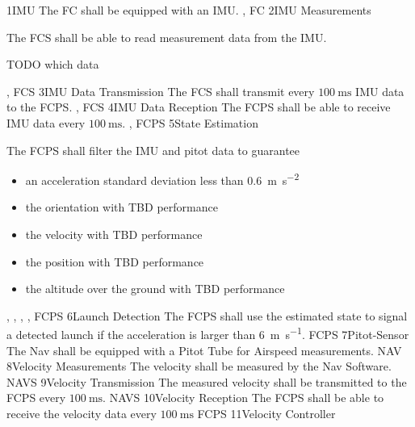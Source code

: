 \req
    {1}{IMU}
    {
        The FC shall be equipped with an IMU.
    }
    {, }
    {FC}
\req
    {2}{IMU Measurements}
    {
        The FCS shall be able to read measurement data from the IMU.

        TODO which data
    }
    {, }
    {FCS}
\req
    {3}{IMU Data Transmission}
    {
        The FCS shall transmit every $\SI{100}{\milli\second}$ IMU data to the FCPS.
    }
    {, }
    {FCS}
\req
    {4}{IMU Data Reception}
    {
        The FCPS shall be able to receive IMU data every $\SI{100}{\milli\second}$.
    }
    {, }
    {FCPS}
\req
    {5}{State Estimation}
    {
        The FCPS shall filter the IMU and pitot data to guarantee
        \begin{itemize}
            \item an acceleration standard deviation less than \SI{0.6}{\meter \per \second^2}
            \item the orientation with TBD performance
            \item the velocity with TBD performance
            \item the position with TBD performance
            \item the altitude over the ground with TBD performance
        \end{itemize}
    }
    {, , , , }
    {FCPS}
\req
    {6}{Launch Detection}
    {
        The FCPS shall use the estimated state to signal a detected
        launch if the acceleration is larger than \SI{6}{\meter \per \second}.
    }
    {}
    {FCPS}
\req
    {7}{Pitot-Sensor}
    {
        The Nav shall be equipped with a Pitot Tube for Airspeed measurements.
    }
    {}
    {NAV}
\req
    {8}{Velocity Measurements}
    {
        The velocity shall be measured by the Nav Software.
    }
    {}
    {NAVS}
\req
    {9}{Velocity Transmission}
    {
        The measured velocity shall be transmitted to the
        FCPS every $\SI{100}{\milli \second}$.
    }
    {}
    {NAVS}
\req
    {10}{Velocity Reception}
    {
        The FCPS shall be able to receive the velocity data
        every $\SI{100}{\milli\second}$
    }
    {}
    {FCPS}
\req
    {11}{Velocity Controller}
